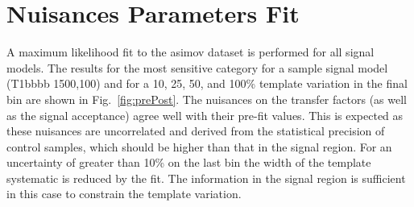 \clearpage
\section{Nuisances Parameters Fit\label{app:prePostFit}}

A maximum likelihood fit to the asimov dataset is performed for all signal models. 
The results for the most sensitive category for a sample signal model (T1bbbb 1500,100) and for 
a 10, 25, 50, and 100\% template variation in the final bin are shown in Fig.~\ref{fig:prePost}. 
The nuisances on the transfer factors (as well as the signal acceptance) agree 
well with their pre-fit values. This is expected as these nuisances are uncorrelated 
and derived from the statistical precision of control samples, which should be
higher than that in the signal region. For an uncertainty of greater than 10\%
on the last bin the width of the template systematic is reduced by the fit.
The information in the signal region is sufficient in this case
to constrain the template variation. 

